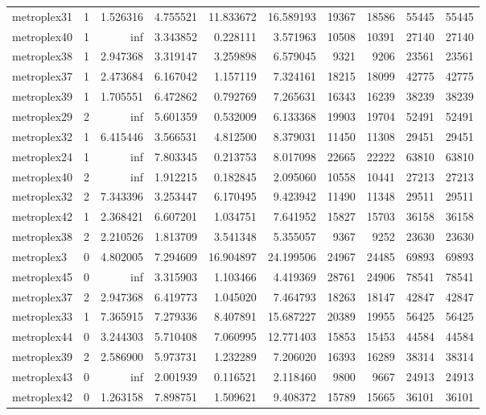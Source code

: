 \begin{longtable}{|l|r|r|r|r|r|r|r|r|r|}
metroplex31 & 1 & 1.526316 & 4.755521 & 11.833672 & 16.589193 & 19367 & 18586 & 55445 & 55445 \\
metroplex40 & 1 & inf & 3.343852 & 0.228111 & 3.571963 & 10508 & 10391 & 27140 & 27140 \\
metroplex38 & 1 & 2.947368 & 3.319147 & 3.259898 & 6.579045 & 9321 & 9206 & 23561 & 23561 \\
metroplex37 & 1 & 2.473684 & 6.167042 & 1.157119 & 7.324161 & 18215 & 18099 & 42775 & 42775 \\
metroplex39 & 1 & 1.705551 & 6.472862 & 0.792769 & 7.265631 & 16343 & 16239 & 38239 & 38239 \\
metroplex29 & 2 & inf & 5.601359 & 0.532009 & 6.133368 & 19903 & 19704 & 52491 & 52491 \\
metroplex32 & 1 & 6.415446 & 3.566531 & 4.812500 & 8.379031 & 11450 & 11308 & 29451 & 29451 \\
metroplex24 & 1 & inf & 7.803345 & 0.213753 & 8.017098 & 22665 & 22222 & 63810 & 63810 \\
metroplex40 & 2 & inf & 1.912215 & 0.182845 & 2.095060 & 10558 & 10441 & 27213 & 27213 \\
metroplex32 & 2 & 7.343396 & 3.253447 & 6.170495 & 9.423942 & 11490 & 11348 & 29511 & 29511 \\
metroplex42 & 1 & 2.368421 & 6.607201 & 1.034751 & 7.641952 & 15827 & 15703 & 36158 & 36158 \\
metroplex38 & 2 & 2.210526 & 1.813709 & 3.541348 & 5.355057 & 9367 & 9252 & 23630 & 23630 \\
metroplex3 & 0 & 4.802005 & 7.294609 & 16.904897 & 24.199506 & 24967 & 24485 & 69893 & 69893 \\
metroplex45 & 0 & inf & 3.315903 & 1.103466 & 4.419369 & 28761 & 24906 & 78541 & 78541 \\
metroplex37 & 2 & 2.947368 & 6.419773 & 1.045020 & 7.464793 & 18263 & 18147 & 42847 & 42847 \\
metroplex33 & 1 & 7.365915 & 7.279336 & 8.407891 & 15.687227 & 20389 & 19955 & 56425 & 56425 \\
metroplex44 & 0 & 3.244303 & 5.710408 & 7.060995 & 12.771403 & 15853 & 15453 & 44584 & 44584 \\
metroplex39 & 2 & 2.586900 & 5.973731 & 1.232289 & 7.206020 & 16393 & 16289 & 38314 & 38314 \\
metroplex43 & 0 & inf & 2.001939 & 0.116521 & 2.118460 & 9800 & 9667 & 24913 & 24913 \\
metroplex42 & 0 & 1.263158 & 7.898751 & 1.509621 & 9.408372 & 15789 & 15665 & 36101 & 36101 \\

\end{longtable}
